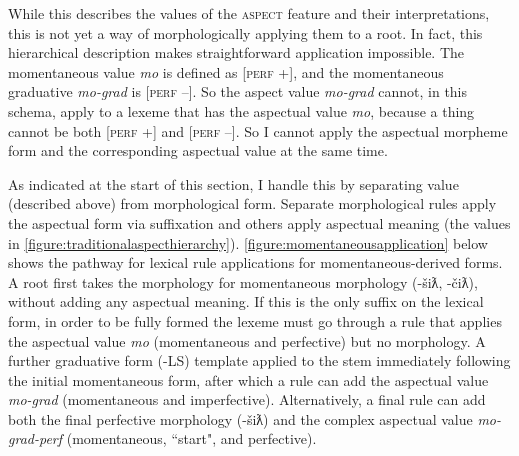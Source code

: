 \begin{figure}[H]
\begin{footnotesize}
\end{footnotesize}
\end{figure}


While this describes the values of the \textsc{aspect} feature and their interpretations, this is not yet a way of morphologically applying them to a root. In fact, this hierarchical description makes straightforward application impossible. The momentaneous value \textit{mo} is defined as [\textsc{perf} +], and the momentaneous graduative \textit{mo-grad} is [\textsc{perf} --]. So the aspect value \textit{mo-grad} cannot, in this schema, apply to a lexeme that has the aspectual value \textit{mo}, because a thing cannot be both [\textsc{perf} +] and [\textsc{perf} --]. So I cannot apply the aspectual morpheme form and the corresponding aspectual value at the same time.

As indicated at the start of this section, I handle this by separating value (described above) from morphological form. Separate morphological rules apply the aspectual form via suffixation and others apply aspectual meaning (the values in \cref{figure:traditionalaspecthierarchy}). \cref{figure:momentaneousapplication} below shows the pathway for lexical rule applications for momentaneous-derived forms. A root first takes the morphology for momentaneous morphology (-šiƛ, -čiƛ), without adding any aspectual meaning. If this is the only suffix on the lexical form, in order to be fully formed the lexeme must go through a rule that applies the aspectual value \textit{mo} (momentaneous and perfective) but no morphology. A further graduative form (-LS) template applied to the stem immediately following the initial momentaneous form, after which a rule can add the aspectual value \textit{mo-grad} (momentaneous and imperfective). Alternatively, a final rule can add both the final perfective morphology (-šiƛ) and the complex aspectual value \textit{mo-grad-perf} (momentaneous, ``start", and perfective).

